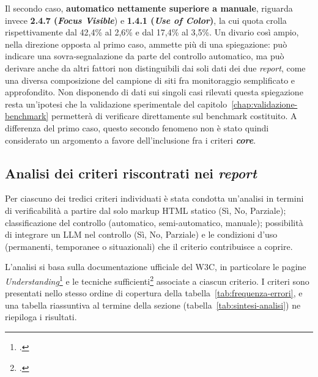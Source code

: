 Il secondo caso, \textbf{automatico nettamente superiore a manuale}, riguarda invece \textbf{2.4.7 (\emph{Focus Visible}}) e \textbf{1.4.1 (\emph{Use of Color})}, la cui quota crolla rispettivamente dal 42,4\% al 2,6\% e dal 17,4\% al 3,5\%. Un divario così ampio, nella direzione opposta al primo caso, ammette più di una spiegazione: può indicare una sovra-segnalazione da parte del controllo automatico, ma può derivare anche da altri fattori non distinguibili dai soli dati dei due \emph{report}, come una diversa composizione del campione di siti fra monitoraggio semplificato e approfondito. Non disponendo di dati sui singoli casi rilevati questa spiegazione resta un'ipotesi che la validazione sperimentale del capitolo~\ref{chap:validazione-benchmark} permetterà di verificare direttamente sul benchmark costituito. A differenza del primo caso, questo secondo fenomeno non è stato quindi considerato un argomento a favore dell'inclusione fra i criteri \textbf{\emph{core}}.



\subsection{Analisi dei criteri riscontrati nei \emph{report}}

Per ciascuno dei tredici criteri individuati è stata condotta un'analisi in termini di verificabilità a partire dal solo markup HTML statico (Sì, No, Parziale); classificazione del controllo (automatico, semi-automatico, manuale); possibilità di integrare un LLM nel controllo (Sì, No, Parziale) e le condizioni d'uso (permanenti, temporanee o situazionali) che il criterio contribuisce a coprire. 

L'analisi si basa sulla documentazione ufficiale del W3C, in particolare le pagine \emph{Understanding}\footcite{w3c:understanding-intro} e le tecniche sufficienti\footcite[Sono le \emph{Sufficient Techniques} ufficiali del W3C, che raccolgono, per i diversi criteri di successo, metodi concreti per soddisfarne i requisiti. Ciascuna tecnica è identificata da un codice composto da una lettera, che indica la tecnologia di riferimento (H=HTML, ARIA=ARIA, C=CSS, G=General, etc.), e da un numero, ed è corredata da una pagina dedicata che ne descrive l'implementazione e le eventuali condizioni d'uso.][]{w3c:techniques} associate a ciascun criterio. I criteri sono presentati nello stesso ordine di copertura della tabella~\ref{tab:frequenza-errori}, e una tabella riassuntiva al termine della sezione (tabella~\ref{tab:sintesi-analisi}) ne riepiloga i risultati.

